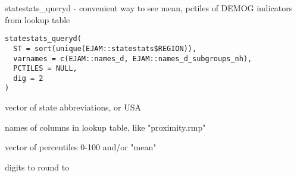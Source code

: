 \documentclass[a4paper]{book}
\begin{document}
%
\begin{Description}\relax
statestats\_queryd - convenient way to see mean, pctiles of DEMOG indicators from lookup table
\end{Description}
%
\begin{Usage}
\begin{verbatim}
statestats_queryd(
  ST = sort(unique(EJAM::statestats$REGION)),
  varnames = c(EJAM::names_d, EJAM::names_d_subgroups_nh),
  PCTILES = NULL,
  dig = 2
)
\end{verbatim}
\end{Usage}
%
\begin{Arguments}
\begin{ldescription}
\item[\code{ST}] vector of state abbreviations, or USA

\item[\code{varnames}] names of columns in lookup table, like "proximity.rmp"

\item[\code{PCTILES}] vector of percentiles 0-100 and/or "mean"

\item[\code{dig}] digits to round to
\end{ldescription}
\end{Arguments}
%
\end{document}
